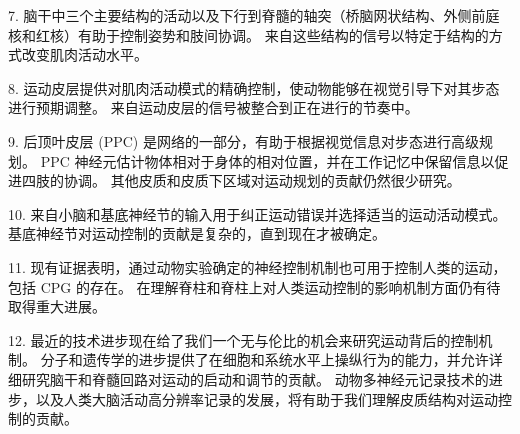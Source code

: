 7. 脑干中三个主要结构的活动以及下行到脊髓的轴突（桥脑网状结构、外侧前庭核和红核）有助于控制姿势和肢间协调。 来自这些结构的信号以特定于结构的方式改变肌肉活动水平。 

8. 运动皮层提供对肌肉活动模式的精确控制，使动物能够在视觉引导下对其步态进行预期调整。 来自运动皮层的信号被整合到正在进行的节奏中。

9. 后顶叶皮层 (PPC) 是网络的一部分，有助于根据视觉信息对步态进行高级规划。 PPC 神经元估计物体相对于身体的相对位置，并在工作记忆中保留信息以促进四肢的协调。 其他皮质和皮质下区域对运动规划的贡献仍然很少研究。 

10. 来自小脑和基底神经节的输入用于纠正运动错误并选择适当的运动活动模式。 基底神经节对运动控制的贡献是复杂的，直到现在才被确定。 

11. 现有证据表明，通过动物实验确定的神经控制机制也可用于控制人类的运动，包括 CPG 的存在。 在理解脊柱和脊柱上对人类运动控制的影响机制方面仍有待取得重大进展。 

12. 最近的技术进步现在给了我们一个无与伦比的机会来研究运动背后的控制机制。 分子和遗传学的进步提供了在细胞和系统水平上操纵行为的能力，并允许详细研究脑干和脊髓回路对运动的启动和调节的贡献。 动物多神经元记录技术的进步，以及人类大脑活动高分辨率记录的发展，将有助于我们理解皮质结构对运动控制的贡献。

